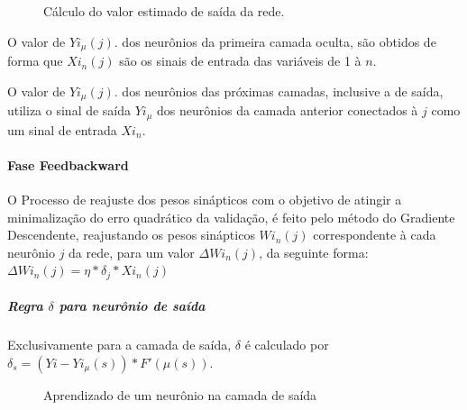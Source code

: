 \documentclass[	12pt, Times, openright, twoside, a4paper, english, brazil]{abntex2}
\begin{document}
           \begin{figure}[!ht]
          	\caption{Cálculo do valor estimado de saída da rede.}
           \end{figure}
            
            O valor de $Yi_{\mu}(j)$. dos neurônios da primeira camada oculta, são obtidos de forma que $Xi_{n}(j)$ são os sinais de entrada das variáveis de 1 à $n$.
            
            O valor de $Yi_{\mu}(j)$. dos neurônios das próximas camadas, inclusive a de saída, utiliza o sinal de saída $Yi_{\mu}$ dos neurônios da camada anterior conectados à $j$ como um sinal de entrada $Xi_{n}$.
            
            \paragraph*{Fase Feedbackward}
            O Processo de reajuste dos pesos sinápticos com o objetivo de atingir a minimalização do erro quadrático da validação, é feito pelo método do Gradiente Descendente, reajustando os pesos sinápticos $Wi_{n}(j)$ correspondente à cada neurônio $j$ da rede, para um valor $\Delta Wi_{n}(j)$, da seguinte forma:\\
            $\Delta Wi_{n}(j) = \eta*\delta_j*Xi_{n}(j)$\\
            
            \subparagraph*{Regra $\delta$ para neurônio de saída}
            Exclusivamente para a camada de saída, $\delta$ é calculado por\\
            $\delta_s = (Yi - Yi_{\mu}(s) )*F'(\mu(s))$.
            \begin{figure}[!ht]
          	\caption{Aprendizado de um neurônio na camada de saída}
           \end{figure}
            
\end{document}
